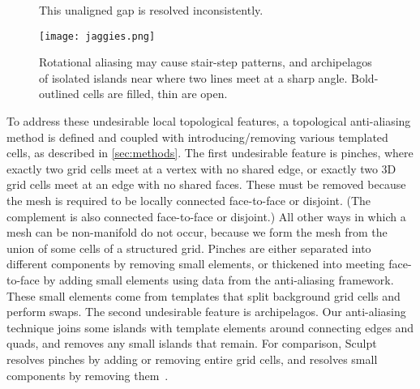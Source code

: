 \begin{figure}[t]
\centering
{}
\hspace{8pt}
\caption{This unaligned gap is resolved inconsistently.}
\label{fig:diagonal}
\end{figure}


\begin{figure}[t]
\centering
\texttt{[image: jaggies.png]}
\caption{Rotational aliasing may cause stair-step patterns, and archipelagos of isolated islands near where two lines meet at a sharp angle. 
Bold-outlined cells are filled, thin are open.}
\label{fig:jaggies}
\end{figure}

To address these undesirable local topological features, a topological anti-aliasing method is defined and coupled with introducing/removing various templated cells, as described in \cref{sec:methods}.
The first undesirable feature is pinches, where exactly two grid cells meet at a vertex with no shared edge, or exactly two 3D grid cells meet at an edge with no shared faces. 
These must be removed because the mesh is required to be locally connected face-to-face or disjoint.
(The complement is also connected face-to-face or disjoint.)
%
All other ways in which a mesh can be non-manifold do not occur, because we form the mesh from the union of some cells of a structured grid.
%
Pinches are either separated into different components by removing small elements, or thickened into meeting face-to-face by adding small elements using data from the anti-aliasing framework.
These small elements come from templates that split background grid cells and perform swaps.
%
The second undesirable feature is archipelagos.
%
Our anti-aliasing technique joins some islands with template elements around connecting edges and quads, and removes any small islands that remain.
%
For comparison, Sculpt resolves pinches by adding or removing entire grid cells,
and resolves small components by removing them~\cite{owen2017hexahedral}.

